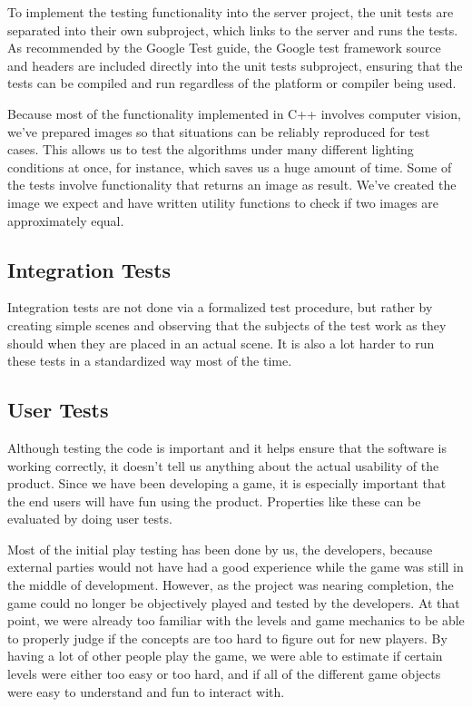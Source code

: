             To implement the testing functionality into the server project, 
            the unit tests are separated into their own subproject, which 
            links to the server and runs the tests. As recommended by the 
            Google Test guide, the Google test framework source and headers 
            are included directly into the unit tests subproject, ensuring 
            that the tests can be compiled and run regardless of the platform 
            or compiler being used.

            Because most of the functionality implemented in C++ involves
            computer vision, we've prepared images so that situations can be
            reliably reproduced for test cases. This allows us to test the
            algorithms under many different lighting conditions at once, for
            instance, which saves us a huge amount of time. Some of the tests
            involve functionality that returns an image as result. We've created
            the image we expect and have written utility functions to check if
            two images are approximately equal.
		
		\subsection{Integration Tests} \label{ssec:integrationtests}
			Integration tests are not done via a formalized test procedure, but 
			rather by creating simple scenes and observing that the subjects of 
			the test work as they should when they are placed in an actual 
			scene. It is also a lot harder to run these tests in a standardized 
			way most of the time.

		\subsection{User Tests}
			Although testing the code is important and it helps ensure that the
			software is working correctly, it doesn't tell us anything about the
			actual usability of the product. Since we have been developing a game, 
			it is especially important that the end users will have fun using the
			product. Properties like these can be evaluated by doing user tests.

			Most of the initial play testing has been done by us, the developers,
			because external parties would not have had a good experience while 
			the game was still in the middle of development. However, as the 
			project was nearing completion, the game could no longer be objectively
			played and tested by the developers. At that point, we were already
			too familiar with the levels and game mechanics to be able to properly
			judge if the concepts are too hard to figure out for new players. By 
			having a lot of other people play the game, we were able to estimate if 
			certain levels were either too easy or too hard, and if all of the 
			different game objects were easy to understand and fun to interact with.

